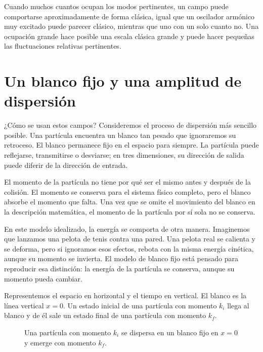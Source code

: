 Cuando muchos cuantos ocupan los modos pertinentes, un campo puede comportarse aproximadamente de forma clásica, igual que un oscilador armónico muy excitado puede parecer clásico, mientras que uno con un solo cuanto no. Una ocupación grande hace posible una escala clásica grande y puede hacer pequeñas las fluctuaciones relativas pertinentes.


\section{Un blanco fijo y una amplitud de dispersión}

¿Cómo se usan estos campos? Consideremos el proceso de dispersión más sencillo posible. Una partícula encuentra un blanco tan pesado que ignoraremos su retroceso. El blanco permanece fijo en el espacio para siempre. La partícula puede reflejarse, transmitirse o desviarse; en tres dimensiones, su dirección de salida puede diferir de la dirección de entrada.

El momento de la partícula no tiene por qué ser el mismo antes y después de la colisión. El momento se conserva para el sistema físico completo, pero el blanco absorbe el momento que falta. Una vez que se omite el movimiento del blanco en la descripción matemática, el momento de la partícula por sí sola no se conserva.

En este modelo idealizado, la energía se comporta de otra manera. Imaginemos que lanzamos una pelota de tenis contra una pared. Una pelota real se calienta y se deforma, pero si ignoramos esos efectos, rebota con la misma energía cinética, aunque su momento se invierta. El modelo de blanco fijo está pensado para reproducir esa distinción: la energía de la partícula se conserva, aunque su momento pueda cambiar.

Representemos el espacio en horizontal y el tiempo en vertical. El blanco es la línea vertical \(x=0\). Un estado inicial de una partícula con momento \(k_i\) llega al blanco y de él sale un estado final de una partícula con momento \(k_f\).

\begin{figure}[h]\centering
{}\caption{Una partícula con momento \(k_i\) se dispersa en un blanco fijo en \(x=0\) y emerge con momento \(k_f\).}\end{figure}

